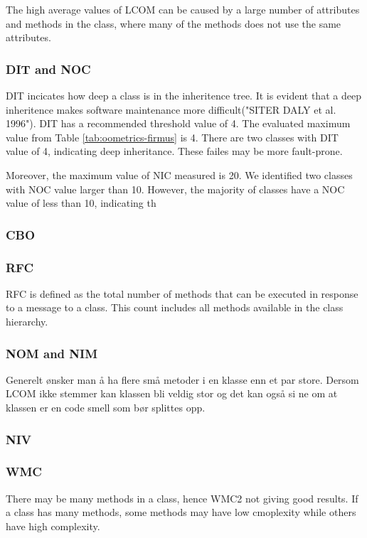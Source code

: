 The high average values of LCOM can be caused by a large number of attributes and methods in the class, where many of the methods does not use the same attributes.


\subsubsection{DIT and NOC}
DIT incicates how deep a class is in the inheritence tree. It is evident that a deep inheritence makes software maintenance more difficult("SITER DALY et al. 1996"). DIT has a recommended threshold value of 4. The evaluated maximum value from Table \ref{tab:oometrics-firmus} is 4. There are two classes with DIT value of 4, indicating deep inheritance. These failes may be more fault-prone.

Moreover, the maximum value of NIC measured is 20. We identified two classes with NOC value larger than 10. However, the majority of classes have a NOC value of less than 10, indicating th

\subsubsection{CBO}

\subsubsection{RFC}
RFC is defined as the total number of methods that can be executed in response to a message to a class. This count includes all methods available in the class hierarchy. 

\subsubsection{NOM and NIM}
Generelt ønsker man å ha flere små metoder i en klasse enn et par store. Dersom LCOM ikke stemmer kan klassen bli veldig stor og det kan også si ne om at klassen er en code smell som bør splittes opp.

\subsubsection{NIV}

\subsubsection{WMC}
There may be many methods in a class, hence WMC2 not giving good results. If a class has many methods, some methods may have low cmoplexity while others have high complexity.




